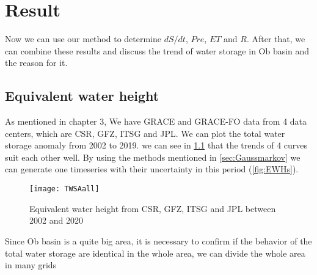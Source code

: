 \chapter{Result}
Now we can use our method to determine $dS/dt$, $Pre$, $ET$ and $R$. After that, we can combine these results and discuss the trend of water storage in Ob basin and the reason for it.
\section{Equivalent water height}
As mentioned in chapter 3, We have GRACE and GRACE-FO data from 4 data centers, which are CSR, GFZ, ITSG and JPL. We can plot the total water storage anomaly from 2002 to 2019. we can see in \ref{fig:4centers} that the trends of 4 curves suit each other well. By using the methods mentioned in \ref{sec:Gaussmarkov} we can generate one timeseries with their uncertainty in this period (\ref{fig:EWHs}).
\begin{figure}[htbp]
	\centering
	\texttt{[image: TWSAall]} %
	\caption{Equivalent water height from CSR, GFZ, ITSG and JPL between 2002 and 2020} 
	\label{fig:4centers}
\end{figure}


Since Ob basin is a quite big area, it is necessary to confirm if the behavior of the total water storage are identical in the whole area, we can divide the whole area in many grids \\


